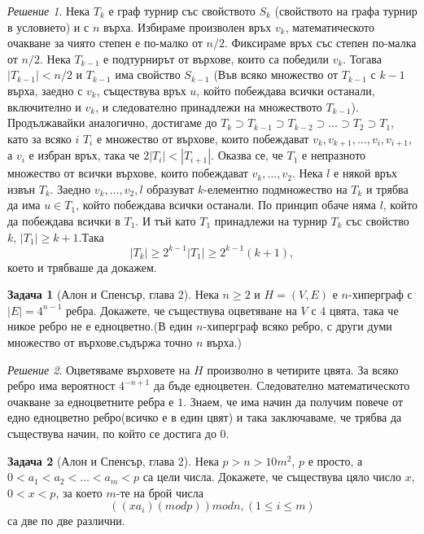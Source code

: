 \documentclass[11 pt, a4paper]{article}
\theoremstyle{definition}
\newtheorem{p}{Задача}
\theoremstyle{remark}
\newtheorem*{s}{Решение}
\begin{document}
\begin{s}
Нека $T_k$ е граф турнир със свойството $S_k$ (свойството на графа турнир в условието) и с $n$ върха. Избираме произволен връх $v_k$, математическото очакване за чиято степен е по-малко от $n/2$. Фиксираме връх със степен по-малка от $n/2$. Нека $T_{k-1}$ е подтурнирът от върхове, които са победили $v_k$. Тогава $|T_{k-1}|<n/2$ и $T_{k-1}$ има свойство $S_{k-1}$ (Във всяко множество от $T_{k-1}$ с $k-1$ върха, заедно с $v_k$, съществува връх $u$, който побеждава всички останали, включително и $v_k$, и следователно принадлежи на множеството $T_{k-1}$). Продължавайки аналогично, достигаме до $T_k\supset T_{k-1}\supset T_{k-2}\supset\dots\supset T_2\supset T_1$, като за всяко $i$ $T_i$ е множество от върхове, които побеждават $v_k, v_{k+1},\dots, v_i, v_{i+1}$, а $v_i$ е избран връх, така че $2|T_i|<|T_{i+1}|$. Оказва се, че $T_1$ е непразното множество от всички върхове, които побеждават $v_k,\dots,v_2$. Нека $l$ е някой връх извън $T_k$. Заедно $v_k,\dots,v_2,l$ образуват $k$-елементно подмножество на $T_k$ и трябва да има $u\in T_1$, който побеждава всички останали. По принцип обаче няма $l$, който да побеждава всички в $T_1$. И тъй като $T_1$ принадлежи на турнир $T_k$ със свойство $k$, $|T_1|\geq {k+1}$.Така
\begin{equation*}
|T_k|\geq 2^{k-1}|T_1|\geq 2^{k-1}(k+1),
\end{equation*}
което и трябваше да докажем.
\end{s}
\begin{p}[Алон и Спенсър, глава 2]
Нека $n\geq2$ и $H=(V,E)$ е $n$-хиперграф с $|E|=4^{n-1}$ ребра. Докажете, че съществува оцветяване на $V$ с $4$ цвята, така че никое ребро не е едноцветно.(В един $n$-хиперграф всяко ребро, с други думи множество от върхове,съдържа точно $n$ върха.) 
\end{p}
\begin{s}
Оцветяваме върховете на $H$ произволно в четирите цвята. За всяко ребро има вероятност $4^{-n+1}$ да бъде едноцветен. Следователно математическото очакване за едноцветните ребра е $1$. Знаем, че има начин да получим повече от едно едноцветно ребро(всичко е в един цвят) и така заключаваме, че трябва да съществува начин, по който се достига до $0$. 
\end{s}
\begin{p}[Алон и Спенсър, глава 2]
Нека $p>n>10m^2$, $p$ е просто, а $0<a_1<a_2<\dots<a_m<p$ са цели числа. Докажете, че съществува цяло число $x$, $0<x<p$, за което $m$-те на брой числа
\begin{equation*}
((xa_i) (mod p)) mod n, (1\leq i\leq m)
\end{equation*}
са две по две различни.
\end{p}
\end{document}
